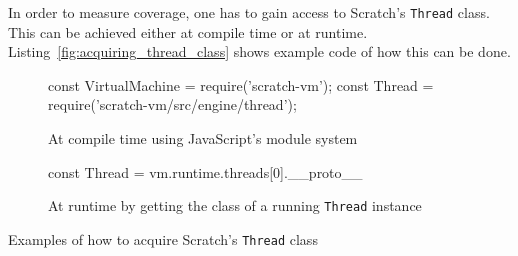 In order to measure coverage, one has to gain access to Scratch's \texttt{Thread} class.
This can be achieved either at compile time or at runtime.
Listing~\ref{fig:acquiring_thread_class} shows example code of how this can be done.
\parspace

\begin{listing}[htpb]
    \centering

    \begin{subfigure}[b]{.7\textwidth}
        \begin{javascriptcode}
            const VirtualMachine = require('scratch-vm');
            const Thread = require('scratch-vm/src/engine/thread');
        \end{javascriptcode}
        \vspace{-\bigskipamount}
        \caption{At compile time using JavaScript's module system}
    \end{subfigure}

    \bigskip

    \begin{subfigure}[b]{.7\textwidth}
        \begin{javascriptcode}
            const Thread = vm.runtime.threads[0].__proto__
        \end{javascriptcode}
        \vspace{-\bigskipamount}
        \caption{At runtime by getting the class of a running \texttt{Thread} instance}
    \end{subfigure}

    \caption{Examples of how to acquire Scratch's \texttt{Thread} class}
    \label{fig:acquiring_thread_class}
\end{listing}

